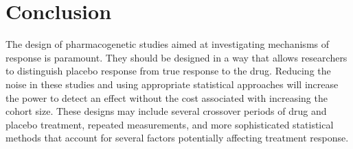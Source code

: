 
\section*{Conclusion}

The design of pharmacogenetic studies aimed at investigating mechanisms of response is paramount. They should be designed in a way that allows researchers to distinguish placebo response from true response to the drug. Reducing the noise in these studies and using appropriate statistical approaches will increase the power to detect an effect without the cost associated with increasing the cohort size. These designs may include several crossover periods of drug and placebo treatment, repeated measurements, and more sophisticated statistical methods that account for several factors potentially affecting treatment response.

